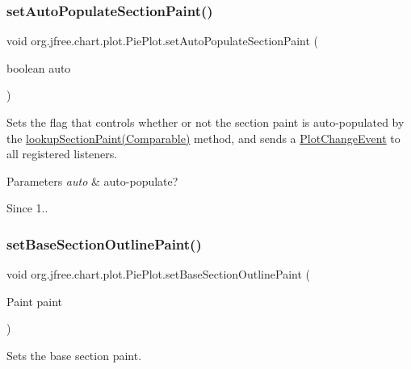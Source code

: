 \subsubsection{\texorpdfstring{set\+Auto\+Populate\+Section\+Paint()}{setAutoPopulateSectionPaint()}}
{\footnotesize\ttfamily void org.\+jfree.\+chart.\+plot.\+Pie\+Plot.\+set\+Auto\+Populate\+Section\+Paint (\begin{DoxyParamCaption}\item[{boolean}]{auto }\end{DoxyParamCaption})}

Sets the flag that controls whether or not the section paint is auto-\/populated by the \mbox{\hyperlink{classorg_1_1jfree_1_1chart_1_1plot_1_1_pie_plot_a4b18bc37829ff565c72d2bdd1acd0bb7}{lookup\+Section\+Paint(\+Comparable)}} method, and sends a \mbox{\hyperlink{}{Plot\+Change\+Event}} to all registered listeners.


\begin{DoxyParams}{Parameters}
{\em auto} & auto-\/populate?\\
\hline
\end{DoxyParams}
\begin{DoxySince}{Since}
1.. 
\end{DoxySince}
\mbox{\label{classorg_1_1jfree_1_1chart_1_1plot_1_1_pie_plot_ad5603a00bd3987c1735ae3c537453424}} 
\subsubsection{\texorpdfstring{set\+Base\+Section\+Outline\+Paint()}{setBaseSectionOutlinePaint()}}
{\footnotesize\ttfamily void org.\+jfree.\+chart.\+plot.\+Pie\+Plot.\+set\+Base\+Section\+Outline\+Paint (\begin{DoxyParamCaption}\item[{Paint}]{paint }\end{DoxyParamCaption})}

Sets the base section paint.



